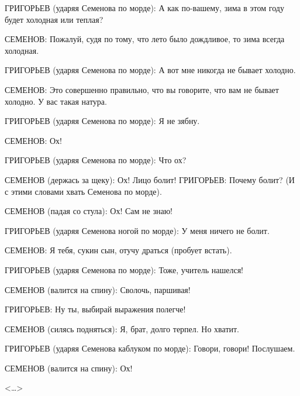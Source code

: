 \hspace*{\parindent} ГРИГОРЬЕВ (ударяя Семенова по морде): А как по-вашему, зима в этом году будет холодная или теплая?

СЕМЕНОВ: Пожалуй, судя по тому, что лето было дождливое, то зима всегда холодная.

ГРИГОРЬЕВ (ударяя Семенова по морде): А вот мне никогда не бывает холодно.

СЕМЕНОВ: Это совершенно правильно, что вы говорите, что вам не бывает холодно. У вас такая натура.

ГРИГОРЬЕВ (ударяя Семенова по морде): Я не зябну.

СЕМЕНОВ: Ох!

ГРИГОРЬЕВ (ударяя Семенова по морде): Что ох?

СЕМЕНОВ (держась за щеку): Ох! Лицо болит! ГРИГОРЬЕВ: Почему болит? (И с этими словами хвать Семенова по морде).

СЕМЕНОВ (падая со стула): Ох! Сам не знаю!

ГРИГОРЬЕВ (ударяя Семенова ногой по морде): У меня ничего не болит.

СЕМЕНОВ: Я тебя, сукин сын, отучу драться (пробует встать).

ГРИГОРЬЕВ (ударяя Семенова по морде): Тоже, учитель нашелся!

СЕМЕНОВ (валится на спину): Сволочь, паршивая!

ГРИГОРЬЕВ: Ну ты, выбирай выражения полегче!

СЕМЕНОВ (силясь подняться): Я, брат, долго терпел. Но хватит.

ГРИГОРЬЕВ (ударяя Семенова каблуком по морде): Говори, говори! Послушаем.

СЕМЕНОВ (валится на спину): Ох!

\begin{flushright}
<\dots>
\end{flushright}
